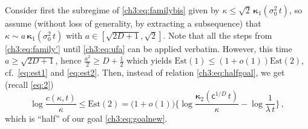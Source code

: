 \documentclass[a4paper,reqno,11pt]{amsart}
\numberwithin{equation}{section}
\newcommand\sfc{\mathsf{c}}
\newcommand\bkappa{\boldsymbol{\kappa}}
\begin{document}
Consider first the subregime of \eqref{ch3:eq:familybis}
given by $\kappa \le \sqrt{2} \, \bkappa_1(\sigma_0^2 \, t)$,
so assume (without loss of generality, by extracting
a subsequence) that $\kappa \sim a \, \bkappa_1(\sigma_0^2 \, t)$ with
$a \in [\sqrt{2D+1}, \sqrt{2}]$.
Note that all the steps from \eqref{ch3:eq:family'} until \eqref{ch3:eq:ufa}
can be applied verbatim. However, this time
$a \ge \sqrt{2D+1}$, hence $\frac{a^2}{2} \ge D+\frac{1}{2}$
which yields $\mathrm{Est}(1) \le (1+o(1))\mathrm{Est}(2)$, cf.\
\eqref{eq:est1} and \eqref{eq:est2}.
Then, instead of relation \eqref{ch3:eq:halfgoal},  we get (recall \eqref{eq:2})
\begin{equation} \label{ch3:eq:halfgoalbis}
	\log \frac{c(\kappa,t)}{\kappa}
	\le \mathrm{Est}(2) =
	\big( 1 + o(1) \big) \bigg\{ \log \frac{\bkappa_2(\sfc^{1/D} \, t)}{\kappa}
	-  \log \frac{1}{\lambda \, t} \bigg\} \,,
\end{equation}
which is ``half'' of our goal \eqref{ch3:eq:goalnew}.
\end{document}
